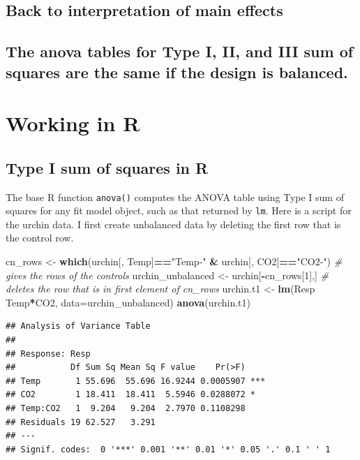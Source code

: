 \documentclass[]{book}
\newenvironment{Shaded}{\begin{snugshade}}{\end{snugshade}}
\newcommand{\KeywordTok}[1]{\textcolor[rgb]{0.13,0.29,0.53}{\textbf{#1}}}
\newcommand{\DataTypeTok}[1]{\textcolor[rgb]{0.13,0.29,0.53}{#1}}
\newcommand{\DecValTok}[1]{\textcolor[rgb]{0.00,0.00,0.81}{#1}}
\newcommand{\StringTok}[1]{\textcolor[rgb]{0.31,0.60,0.02}{#1}}
\newcommand{\CommentTok}[1]{\textcolor[rgb]{0.56,0.35,0.01}{\textit{#1}}}
\newcommand{\OperatorTok}[1]{\textcolor[rgb]{0.81,0.36,0.00}{\textbf{#1}}}
\newcommand{\NormalTok}[1]{#1}
\begin{document}
\subsection{Back to interpretation of main
effects}\label{back-to-interpretation-of-main-effects}

\subsection{The anova tables for Type I, II, and III sum of squares are
the same if the design is
balanced.}\label{the-anova-tables-for-type-i-ii-and-iii-sum-of-squares-are-the-same-if-the-design-is-balanced.}

\section{Working in R}\label{working-in-r-4}

\subsection{Type I sum of squares in
R}\label{type-i-sum-of-squares-in-r}

The base R function \texttt{anova()} computes the ANOVA table using Type
I sum of squares for any fit model object, such as that returned by
\texttt{lm}. Here is a script for the urchin data. I first create
unbalanced data by deleting the first row that is the control row.

\begin{Shaded}
\begin{Highlighting}[]
\NormalTok{cn_rows <-}\StringTok{ }\KeywordTok{which}\NormalTok{(urchin[, Temp]}\OperatorTok{==}\StringTok{"Temp-"} \OperatorTok{&}\StringTok{ }\NormalTok{urchin[, CO2]}\OperatorTok{==}\StringTok{"CO2-"}\NormalTok{) }\CommentTok{# gives the rows of the controls}
\NormalTok{urchin_unbalanced <-}\StringTok{ }\NormalTok{urchin[}\OperatorTok{-}\NormalTok{cn_rows[}\DecValTok{1}\NormalTok{],] }\CommentTok{# deletes the row that is in first element of cn_rows}
\NormalTok{urchin.t1 <-}\StringTok{ }\KeywordTok{lm}\NormalTok{(Resp }\OperatorTok{~}\StringTok{ }\NormalTok{Temp}\OperatorTok{*}\NormalTok{CO2, }\DataTypeTok{data=}\NormalTok{urchin_unbalanced)}
\KeywordTok{anova}\NormalTok{(urchin.t1)}
\end{Highlighting}
\end{Shaded}

\begin{verbatim}
## Analysis of Variance Table
## 
## Response: Resp
##           Df Sum Sq Mean Sq F value    Pr(>F)    
## Temp       1 55.696  55.696 16.9244 0.0005907 ***
## CO2        1 18.411  18.411  5.5946 0.0288072 *  
## Temp:CO2   1  9.204   9.204  2.7970 0.1108298    
## Residuals 19 62.527   3.291                      
## ---
## Signif. codes:  0 '***' 0.001 '**' 0.01 '*' 0.05 '.' 0.1 ' ' 1
\end{verbatim}
\end{document}

